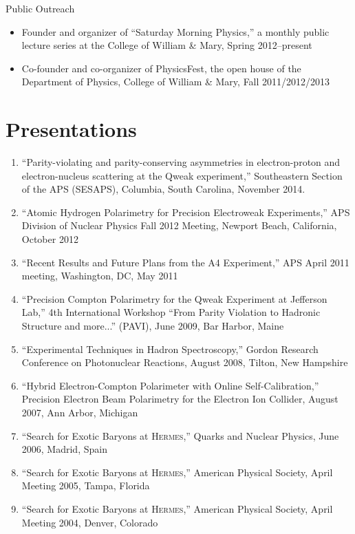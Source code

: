 \documentclass[overlapped,line,final,11pt,letterpaper]{res}
\begin{document}
\begin{resume}
Public Outreach
\begin{itemize}
 \item Founder and organizer of ``Saturday Morning Physics,'' a monthly public lecture series at the College of William \& Mary, Spring 2012--present
 \item Co-founder and co-organizer of PhysicsFest, the open house of the Department of Physics, College of William \& Mary, Fall 2011/2012/2013
\end{itemize}


\section{\bf Presentations}

\begin{enumerate}
\section{\bf\small\quad Conferences}
\item ``Parity-violating and parity-conserving asymmetries in electron-proton and electron-nucleus scattering at the Qweak experiment,'' Southeastern Section of the APS (SESAPS), Columbia, South Carolina, November 2014.
\item ``Atomic Hydrogen Polarimetry for Precision Electroweak Experiments,'' APS Division of Nuclear Physics Fall 2012 Meeting, Newport Beach, California, October 2012
\item ``Recent Results and Future Plans from the A4 Experiment,'' APS April 2011 meeting, Washington, DC, May 2011
\item ``Precision Compton Polarimetry for the Qweak Experiment at Jefferson Lab,'' 4th International Workshop ``From Parity Violation to Hadronic Structure and more...'' (PAVI), June 2009, Bar Harbor, Maine
\item ``Experimental Techniques in Hadron Spectroscopy,'' Gordon Research Conference on Photonuclear Reactions, August 2008, Tilton, New Hampshire
\item ``Hybrid Electron-Compton Polarimeter with Online Self-Calibration,'' Precision Electron Beam Polarimetry for the Electron Ion Collider, August 2007, Ann Arbor, Michigan
\item ``Search for Exotic Baryons at \textsc{Hermes},'' Quarks and Nuclear Physics, June 2006, Madrid, Spain
\item ``Search for Exotic Baryons at \textsc{Hermes},'' American Physical Society, April Meeting 2005, Tampa, Florida
\item ``Search for Exotic Baryons at \textsc{Hermes},'' American Physical Society, April Meeting 2004, Denver, Colorado
\end{enumerate}


\end{resume}
\end{document}
